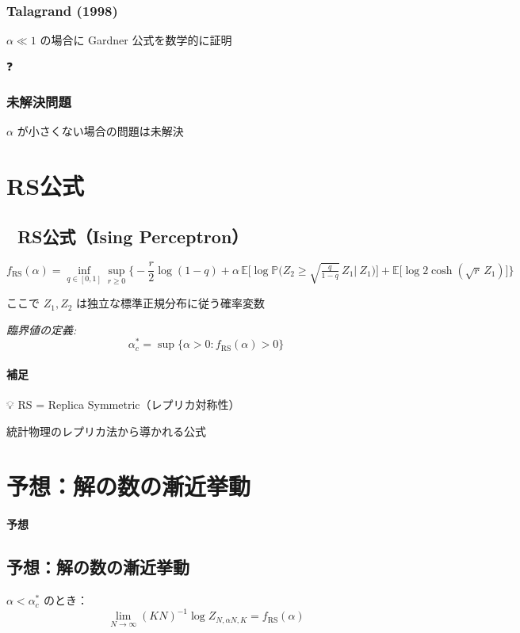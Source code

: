\documentclass[uplatex,dvipdfmx,11pt,a4paper,openany]{bxjsbook}
\begin{document}
📜

\subsubsection{Talagrand (1998)}
\( \alpha \ll 1 \) の場合に Gardner 公式を数学的に証明

❓

\subsubsection{未解決問題}
\( \alpha \) が小さくない場合の問題は未解決

\section{RS公式}
\subsection{📐 RS公式（Ising Perceptron）}
\[
                    f_{\mathrm{RS}}(\alpha)
                    = \inf_{q \in [0,1]} \sup_{r \ge 0}
                    \Big\{
                        -\frac{r}{2}\log(1-q)
                        + \alpha \, \mathbb{E}\Big[\log \mathbb{P}\Big(Z_2\geq \sqrt{\tfrac{q}{1-q}}\,Z_1\Big|~Z_1\Big)\Big]
                        + \mathbb{E}\big[\log 2\cosh(\sqrt{r}\,Z_1)\big]
                    \Big\}
                \]

ここで \(Z_1, Z_2\) は独立な標準正規分布に従う確率変数

\emph{臨界値の定義:}\allowbreak{} 
\[ \alpha_c^* = \sup\{\alpha > 0 : f_{\mathrm{RS}}(\alpha) > 0\} \]

\paragraph{補足}
💡 RS = Replica Symmetric（レプリカ対称性）

\allowbreak{}

統計物理のレプリカ法から導かれる公式


\section{予想：解の数の漸近挙動}
\paragraph{予想}
\subsection{予想：解の数の漸近挙動}
\(\alpha < \alpha_c^*\) のとき：
                \[ \lim_{N \to \infty} (KN)^{-1} \log Z_{N, \alpha N,K} = f_{\mathrm{RS}}(\alpha) \]
\end{document}
